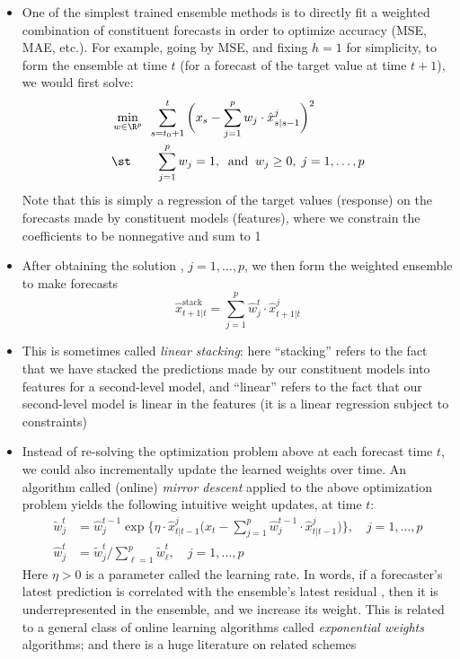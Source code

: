 \documentclass{article}
\begin{document}
\begin{itemize}
\item One of the simplest trained ensemble methods is to directly fit a weighted 
  combination of constituent forecasts in order to optimize accuracy (MSE, MAE,
  etc.). For example, going by MSE, and fixing $h=1$ for simplicity, to form the
  ensemble at time $t$ (for a forecast of the target value at time $t+1$), we
  would first solve:
  \begin{alignat*}{2}
  &\min_{w \in \R^p} && \hspace{-6pt} \sum_{s=t_0+1}^t \bigg( x_s - \sum_{j=1}^p
  w_j \cdot \hat{x}^j_{s|s-1} \bigg)^2 \\   
  &\st \quad && \sum_{j=1}^p w_j = 1, \;\;\text{and} \;\; w_j \geq 0, \;
  j=1,\dots,p   
  \end{alignat*}
  Note that this is simply a regression of the target values (response) on the
  forecasts made by constituent models (features), where we constrain the
  coefficients to be nonnegative and sum to 1

\item After obtaining the solution , $j = 1,\dots,p$, we
  then form the weighted ensemble to make forecasts 
  \[
  \hat{x}^{\text{stack}}_{t+1|t} = \sum_{j=1}^p \hat{w}^t_j \cdot
  \hat{x}^j_{t+1|t} 
  \]

\item This is sometimes called \emph{linear stacking}: here ``stacking'' refers
  to the fact that we have stacked the predictions made by our constituent
  models into features for a second-level model, and ``linear'' refers to the
  fact that our second-level model is linear in the features (it is a linear
  regression subject to constraints)  

\item Instead of re-solving the optimization problem above at each forecast time
  $t$, we could also incrementally update the learned weights over time. An
  algorithm called (online) \emph{mirror descent} applied to the above
  optimization problem yields the following intuitive weight updates, at time
  $t$:     
  \begin{align*}
  \tilde{w}^t_j &= \hat{w}^{t-1}_j \exp\bigg\{ \eta \cdot \hat{x}^j_{t|t-1}
    \bigg( x_t -  \sum_{j=1}^p \hat{w}^{t-1}_j \cdot \hat{x}^j_{t|t-1} \bigg)
    \bigg\}, \quad j = 1,\dots,p \\
  \hat{w}^t_j &= \tilde{w}^t_j \bigg/ \sum_{\ell=1}^p \tilde{w}^t_\ell, \quad j =
    1,\dots,p 
  \end{align*}
  Here $\eta > 0$ is a parameter called the learning rate. In words, if a
  forecaster's latest prediction  is correlated with
  the ensemble's latest residual , then it is underrepresented in the ensemble, and
  we increase its weight. This is related to a general class of online learning 
  algorithms called \emph{exponential weights} algorithms; and there is a 
  huge literature on related schemes


\end{itemize}
\end{document}
